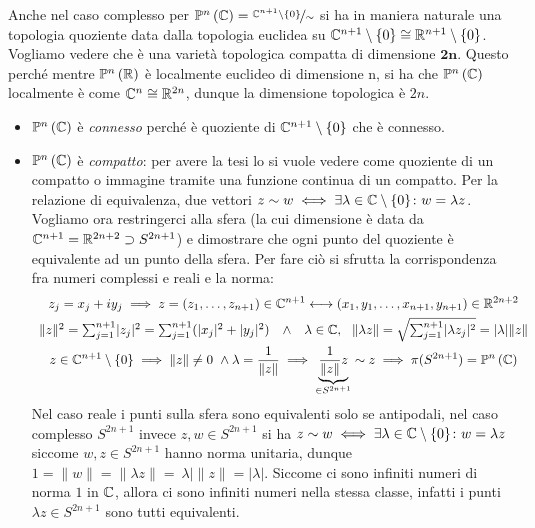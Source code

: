Anche nel caso complesso per $\proj[n]{\complexset}=\nicefrac{\complexset^{n+1}\setminus\{0\}}{\sim}$ si ha in maniera naturale una topologia quoziente data dalla topologia euclidea su $\mathbb{C}^{n+1}\setminus\{0\} \cong \mathbb{R}^{n+1}\setminus\{0\}$.\newline
Vogliamo vedere che è una varietà topologica compatta di dimensione $\mathbf{2n}$. Questo perché mentre $\proj[n]{\realset}$ è localmente euclideo di dimensione n, si ha che $\proj[n]{\complexset}$ localmente è come $\mathbb{C}^n\cong\mathbb{R}^{2n}$, dunque la dimensione topologica è $2n$.
\begin{itemize}
	\item $\proj[n]{\complexset}$ è \textit{connesso} perché è quoziente di $\mathbb{C}^{n+1}\setminus\{0\}$ che è connesso.
	\item $\proj[n]{\complexset}$ è \textit{compatto}: per avere la tesi lo si vuole vedere come quoziente di un compatto o immagine tramite una funzione continua di un compatto. Per la relazione di equivalenza, due vettori $z\sim w\iff \exists\lambda\in\mathbb{C}\setminus\{0\}\colon w=\lambda z$. Vogliamo ora restringerci alla sfera (la cui dimensione è data da $\mathbb{C}^{n+1}=\mathbb{R}^{2n+2}\supset S^{2n+1}$) e dimostrare che ogni punto del quoziente è equivalente ad un punto della sfera. Per fare ciò si sfrutta la corrispondenza fra numeri complessi e reali e la norma:
		\begin{gather*}
			z_j=x_j+iy_j\implies  z=(z_1,\dots,z_{n+1})\in\complexset^{n+1}\longleftrightarrow (x_1,y_1,\dots,x_{n+1},y_{n+1})\in\realset^{2n+2}\\
			\begin{array}{ccc}
				\|z\|^2=\sum_{j=1}^{n+1} \lvert z_j\rvert ^2=\sum_{j=1}^{n+1}(\lvert x_j \rvert ^2 +\lvert y_j \rvert ^2) & \wedge & \lambda\in\complexset,\  \ \|\lambda z \| =\sqrt{\sum_{j=1}^{n+1}\lvert \lambda z_j \rvert ^2}=\lvert\lambda\rvert \| z\|
			\end{array} \\
			z\in\complexset^{n+1}\setminus\{0\}\implies \|z\|\neq 0 \ \wedge \lambda=\frac{1}{\| z\|} \implies \underbrace{\frac{1}{\|z\|}z}_{\in S^{2n+1}}\sim z \implies \pi(S^{2n+1})=\proj[n]{\complexset}
		\end{gather*}
	Nel caso reale i punti sulla sfera sono equivalenti solo se antipodali, nel caso complesso $S^{2n+1}$ invece $z,w\in S^{2n+1}$ si ha $z\sim w\iff \exists \lambda\in\mathbb{C}\setminus\{0\} \colon w=\lambda z$ siccome $w,z\in S^{2n+1}$ hanno norma unitaria, dunque $1=\| w\|=\|\lambda z\|= \ \lambda | \|z\|=|\lambda|$. Siccome ci sono infiniti numeri di norma $1$ in $\mathbb{C}$, allora ci sono infiniti numeri nella stessa classe, infatti i punti $\lambda z\in S^{2n+1}$ sono tutti equivalenti. 		

\end{itemize}
